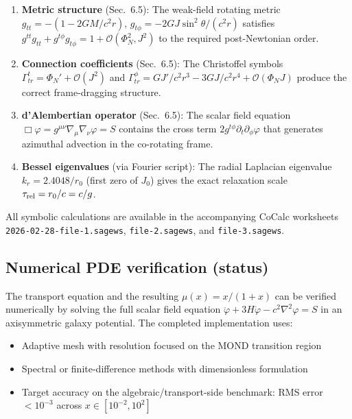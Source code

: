 \documentclass[11pt]{article}
\begin{document}
\begin{enumerate}
\item \textbf{Metric structure} (Sec.~6.5): The weak-field rotating metric
  $g_{tt}=-(1-2GM/c^2r)$, $g_{t\phi}=-2GJ\sin^2\theta/(c^2r)$
  satisfies $g^{tt}g_{tt}+g^{t\phi}g_{t\phi}=1+\mathcal{O}(\Phi_N^2,J^2)$ to the
  required post-Newtonian order.
  
\item \textbf{Connection coefficients} (Sec.~6.5): The Christoffel symbols
  $\Gamma^t_{tr}=\Phi_N'+\mathcal{O}(J^2)$ and
  $\Gamma^\phi_{tr}=GJ'/c^2r^3-3GJ/c^2r^4+\mathcal{O}(\Phi_N J)$
  produce the correct frame-dragging structure.
  
\item \textbf{d'Alembertian operator} (Sec.~6.5): The scalar field equation
  $\Box\varphi=g^{\mu\nu}\nabla_\mu\nabla_\nu\varphi=S$ contains the
  cross term $2g^{t\phi}\partial_t\partial_\phi\varphi$ that generates
  azimuthal advection in the co-rotating frame.
  
\item \textbf{Bessel eigenvalues} (via Fourier script): The radial Laplacian
  eigenvalue $k_r=2.4048/r_0$ (first zero of $J_0$) gives the exact
  relaxation scale $\tau_{\rm rel}=r_0/c=c/g$.
\end{enumerate}

All symbolic calculations are available in the accompanying CoCalc worksheets
\nolinkurl{2026-02-28-file-1.sagews}, \nolinkurl{file-2.sagews}, and
\nolinkurl{file-3.sagews}.

\subsection{Numerical PDE verification (status)}\label{sec:tier_residuals}

The transport equation and the resulting $\mu(x)=x/(1+x)$ can be verified
numerically by solving the full scalar field equation
$\ddot{\varphi}+3H\dot{\varphi}-c^2\nabla^2\varphi=S$ in an axisymmetric
galaxy potential.  The completed implementation uses:
\begin{itemize}
\item Adaptive mesh with resolution focused on the MOND transition region
\item Spectral or finite-difference methods with dimensionless formulation
\item Target accuracy on the algebraic/transport-side benchmark: RMS error
  $<10^{-3}$ across $x\in[10^{-2},10^2]$
\end{itemize}
\end{document}

